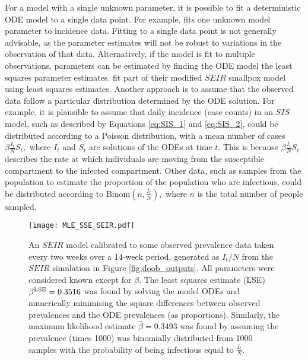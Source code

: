 For a model with a single unknown parameter,
it is possible to fit a deterministic ODE model
to a single data point. For example, \cite{champagne_using_2022} fits one
unknown model parameter to incidence data. Fitting to a single data point
is not generally advisable, as the parameter estimates will not be
robust to variations in the observation of that data.
Alternatively, if the model is fit to multiple observations,
parameters can be estimated by finding the ODE model the least squares 
parameter estimates.
 fit part of their modified $SEIR$ smallpox model
using least squares estimates.
Another approach
is to assume that the observed data follow a particular distribution
determined by the ODE solution. For example, it is plausible to assume that
daily incidence (case counts) in an $SIS$ model, such as described by Equations
\ref{eq:SIS_1} and \ref{eq:SIS_2},
could be distributed according to a Poisson
distribution, with a mean number of cases $\beta \frac{I_t}{N}S_t,$ where $I_t$
and $S_t$ are solutions of the ODEs at time $t$. This is because
$\beta \frac{I_t}{N}S_t$ describes the rate at which individuals are moving
from the susceptible compartment to the infected compartment.
Other data, such as samples from the population to estimate
the proportion of the population who are infectious, could be
distributed according to $\mathrm{Binom}(n, \frac{I_t}{N}),$
where $n$ is the total number
of people sampled.

\begin{figure}[htbp]
    \centering
    \texttt{[image: MLE\_SSE\_SEIR.pdf]}
    \caption[{
        Maximum likelihood and least squares parameter estimates for an $SEIR$
        model
    }]{
        An $SEIR$ model calibrated
        to some observed prevalence data taken every two
        weeks over a 14-week period, generated as $I_t/N$ from the $SEIR$
        simulation in Figure \ref{fig:doob_outputs}.
        All parameters were considered known except for $\beta$.
        The least squares estimate (LSE) $\beta^{\mathrm{LSE}} = 0.3516$
        was found by solving the model ODEs and numerically minimising the
        square differences between observed prevalences and the ODE prevalences
        (as proportions). Similarly, the maximum likelihood estimate
        $\hat{\beta} = 0.3493$
        was found by assuming the prevalence (times 1000) was binomially
        distributed from 1000 samples with the probability of being infectious
        equal to $\frac{I_t}{N}.$
    }
    \label{fig:MLE_SSE}
\end{figure}

